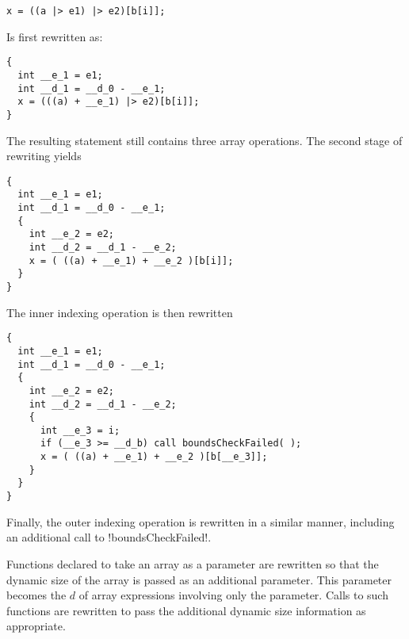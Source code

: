 \singlespace
\vspace{1.0ex}
\begin{lstlisting}[language=nesC]
x = ((a |> e1) |> e2)[b[i]];
\end{lstlisting}
\vspace{1.0ex}
\primaryspacing

Is first rewritten as:

\singlespace
\vspace{1.0ex}
\begin{lstlisting}[language=nesC]
{
  int __e_1 = e1;
  int __d_1 = __d_0 - __e_1;
  x = (((a) + __e_1) |> e2)[b[i]];
}
\end{lstlisting}
\vspace{1.0ex}
\primaryspacing

The resulting statement still contains three array operations. The second stage of rewriting
yields

\singlespace
\vspace{1.0ex}
\begin{lstlisting}[language=nesC]
{
  int __e_1 = e1;
  int __d_1 = __d_0 - __e_1;
  {
    int __e_2 = e2;
    int __d_2 = __d_1 - __e_2;
    x = ( ((a) + __e_1) + __e_2 )[b[i]];
  }
}
\end{lstlisting}
\vspace{1.0ex}
\primaryspacing

The inner indexing operation is then rewritten

\singlespace
\vspace{1.0ex}
\begin{lstlisting}[language=nesC]
{
  int __e_1 = e1;
  int __d_1 = __d_0 - __e_1;
  {
    int __e_2 = e2;
    int __d_2 = __d_1 - __e_2;
    {
      int __e_3 = i;
      if (__e_3 >= __d_b) call boundsCheckFailed( );
      x = ( ((a) + __e_1) + __e_2 )[b[__e_3]];
    }
  }
}
\end{lstlisting}
\vspace{1.0ex}
\primaryspacing

Finally, the outer indexing operation is rewritten in a similar manner, including an additional
call to !boundsCheckFailed!.


Functions declared to take an array as a parameter are rewritten so that the dynamic size of the
array is passed as an additional parameter. This parameter becomes the $d$ of array expressions
involving only the parameter. Calls to such functions are rewritten to pass the additional
dynamic size information as appropriate.

